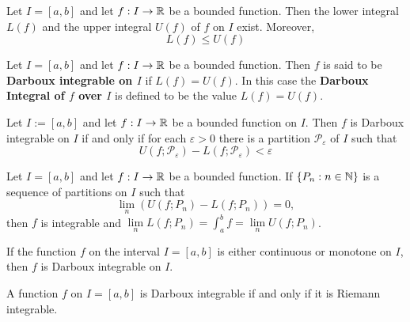 \begin{theorem}
	Let $I=[a,b]$ and let $f:I \to \mathbb{R}$ be a bounded function. Then the lower integral $L(f)$ and the upper integral $U(f)$ of $f$ on $I$ exist. Moreover,
	\[L(f)\leq U(f)\]
\end{theorem}

\begin{definition}
	Let $I=[a,b]$ and let $f:I \to \mathbb{R}$ be a bounded function. Then $f$ is said to be \textbf{Darboux integrable on $I$} if $L(f)=U(f)$. In this case the \textbf{Darboux Integral of $f$ over $I$} is defined to be the value $L(f)=U(f)$.
\end{definition}

\begin{theorem}
	Let $I:=[a,b]$ and let $f:I \to \mathbb{R}$ be a bounded function on $I$. Then $f$ is Darboux integrable on $I$ if and only if for each $\varepsilon > 0$ there is a partition $\mathcal{P}_\varepsilon$ of $I$ such that
	\[U(f;\mathcal{P}_\varepsilon)-L(f;\mathcal{P}_\varepsilon)<\varepsilon\]
\end{theorem}

\begin{corollary}
	Let $I=[a,b]$ and let $f:I \to \mathbb{R}$ be a bounded function. If $\{P_n:n \in \mathbb{N}\}$ is a sequence of partitions on $I$ such that
	\[\lim\limits_{n}(U(f;P_n)-L(f;P_n))=0,\]
	then $f$ is integrable and $\lim\limits_{n}L(f;P_n)=\displaystyle\int_{a}^{b}f=\lim\limits_{n}U(f;P_n)$.
\end{corollary}

\begin{theorem}
	If the function $f$ on the interval $I=[a,b]$ is either continuous or monotone on $I$, then $f$ is Darboux integrable on $I$.
\end{theorem}

\begin{theorem}
	A function $f$ on $I=[a,b]$ is Darboux integrable if and only if it is Riemann integrable.
\end{theorem}
